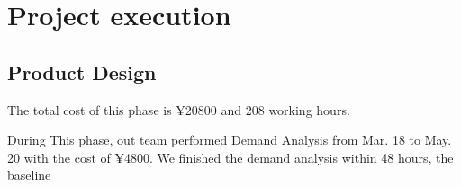 \documentclass[runningheads]{llncs}
\begin{document}
\section{Project execution}

\subsection{Product Design}
The total cost of this phase is ¥20800 and 208 working hours.

During This phase, out team performed Demand Analysis from Mar. 18 to May. 20 with the cost of ¥4800.
We finished the demand analysis within 48 hours, the baseline
\end{document}
